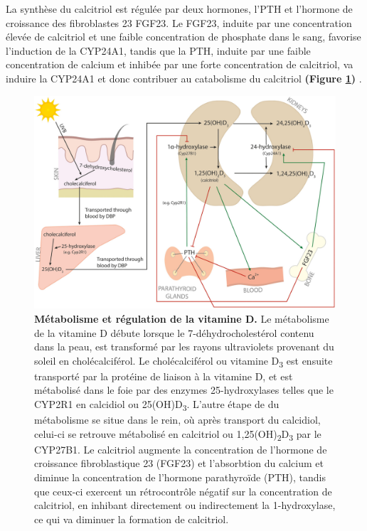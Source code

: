 \documentclass[
  a4paper,
  DIV=11,
  numbers=noendperiod,
  listof=totoc]{scrreprt}
\begin{document}
La synthèse du calcitriol est régulée par deux hormones, l'\ac{PTH} et
l'hormone de croissance des fibroblastes 23 \acs{FGF23}. Le \ac{FGF23},
induite par une concentration élevée de calcitriol et une faible
concentration de phosphate dans le sang, favorise l'induction de la
\ac{CYP24A1}, tandis que la \ac{PTH}, induite par une faible
concentration de calcium et inhibée par une forte concentration de
calcitriol, va induire la \ac{CYP24A1} et donc contribuer au catabolisme
du calcitriol \textbf{(Figure \ref{fig:reg-vitd})}
\autocite{Dankers.2017,Christakos.2010}.

\begin{figure}
\includegraphics{figures/vitamin-d-metabolism-regulation.jpg} 
\caption[\textbf{Métabolisme et régulation de la vitamine D.}]{\textbf{Métabolisme et régulation de la vitamine D.} Le métabolisme de la vitamine D débute lorsque le 7-déhydrocholestérol contenu dans la peau, est transformé par les rayons ultraviolets provenant du soleil en cholécalciférol. Le cholécalciférol ou vitamine D\textsubscript{3} est ensuite transporté par la protéine de liaison à la vitamine D, et est métabolisé dans le foie par des enzymes 25-hydroxylases telles que le CYP2R1 en calcidiol ou 25(OH)D\textsubscript{3}. L'autre étape de du métabolisme se situe dans le rein, où après transport du calcidiol, celui-ci se retrouve métabolisé en calcitriol ou 1,25(OH)\textsubscript{2}D\textsubscript{3} par le CYP27B1. Le calcitriol augmente la concentration de l'hormone de croissance fibroblastique 23 (FGF23) et l'absorbtion du calcium et diminue la concentration de l'hormone parathyroïde (PTH), tandis que ceux-ci exercent un rétrocontrôle négatif sur la concentration de calcitriol, en inhibant directement ou indirectement la 1-hydroxylase, ce qui va diminuer la formation de calcitriol. \cite{Dankers.2017}}
\label{fig:reg-vitd}
\end{figure}
\end{document}

